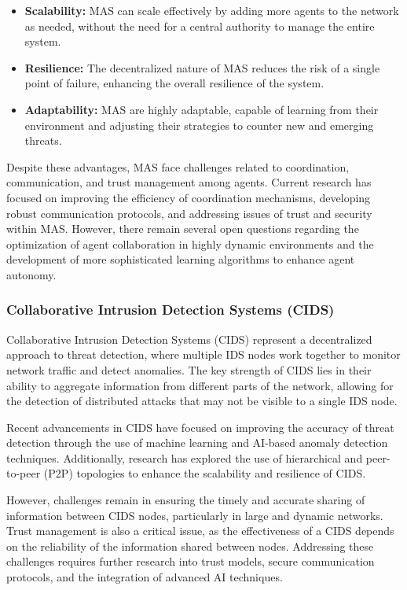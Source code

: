 \begin{itemize}
    \item \textbf{Scalability:} MAS can scale effectively by adding more agents to the network as needed, without the need for a central authority to manage the entire system.
    \item \textbf{Resilience:} The decentralized nature of MAS reduces the risk of a single point of failure, enhancing the overall resilience of the system.
    \item \textbf{Adaptability:} MAS are highly adaptable, capable of learning from their environment and adjusting their strategies to counter new and emerging threats.
\end{itemize}

Despite these advantages, MAS face challenges related to coordination, communication, and trust management among agents. Current research has focused on improving the efficiency of coordination mechanisms, developing robust communication protocols, and addressing issues of trust and security within MAS. However, there remain several open questions regarding the optimization of agent collaboration in highly dynamic environments and the development of more sophisticated learning algorithms to enhance agent autonomy.

\subsubsection{Collaborative Intrusion Detection Systems (CIDS)}

Collaborative Intrusion Detection Systems (CIDS) represent a decentralized approach to threat detection, where multiple IDS nodes work together to monitor network traffic and detect anomalies. The key strength of CIDS lies in their ability to aggregate information from different parts of the network, allowing for the detection of distributed attacks that may not be visible to a single IDS node.

Recent advancements in CIDS have focused on improving the accuracy of threat detection through the use of machine learning and AI-based anomaly detection techniques. Additionally, research has explored the use of hierarchical and peer-to-peer (P2P) topologies to enhance the scalability and resilience of CIDS.

However, challenges remain in ensuring the timely and accurate sharing of information between CIDS nodes, particularly in large and dynamic networks. Trust management is also a critical issue, as the effectiveness of a CIDS depends on the reliability of the information shared between nodes. Addressing these challenges requires further research into trust models, secure communication protocols, and the integration of advanced AI techniques.

